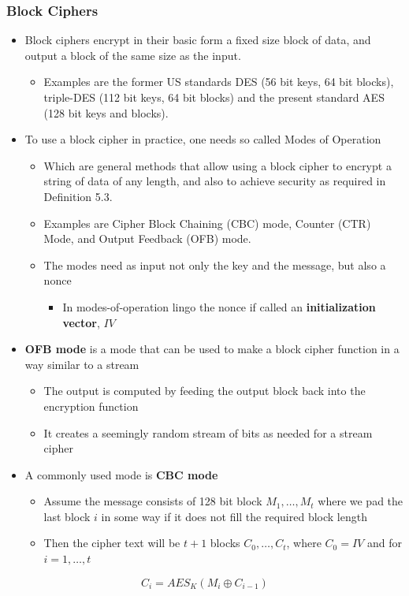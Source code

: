 \documentclass[11pt]{article}
\begin{document}
\subsubsection{Block Ciphers}
\label{sec:orga9925f4}
\begin{itemize}
\item Block ciphers encrypt in their basic form a fixed size block of data, and output a block of the same size as the input.
\begin{itemize}
\item Examples are the former US standards DES (56 bit keys, 64 bit blocks), triple-DES (112 bit keys, 64 bit blocks) and the present standard AES (128 bit keys and blocks).
\end{itemize}

\item To use a block cipher in practice, one needs so called Modes of Operation
\begin{itemize}
\item Which are general methods that allow using a block cipher to encrypt a string of data of any length, and also to achieve security as required in Definition 5.3.
\item Examples are Cipher Block Chaining (CBC) mode, Counter (CTR) Mode, and Output Feedback (OFB) mode.
\item The modes need as input not only the key and the message, but also a nonce
\begin{itemize}
\item In modes-of-operation lingo the nonce if called an \textbf{initialization vector}, \(IV\)
\end{itemize}
\end{itemize}

\item \textbf{OFB mode} is a mode that can be used to make a block cipher function in a way similar to a stream
\begin{itemize}
\item The output is computed by feeding the output block back into the encryption function
\item It creates a seemingly random stream of bits as needed for a stream cipher
\end{itemize}

\item A commonly used mode is \textbf{CBC mode}
\begin{itemize}
\item Assume the message consists of 128 bit block \(M_1, \dots, M_t\) where we pad the last block \(i\) in some way if it does not fill the required block length
\item Then the cipher text will be \(t+1\) blocks \(C_0, \dots, C_t\), where \(C_0=IV\) and for \(i=1, \dots, t\)
\end{itemize}
\end{itemize}
\begin{equation}
  C_i = AES_K(M_i \oplus C_{i-1})
\end{equation}
\end{document}
